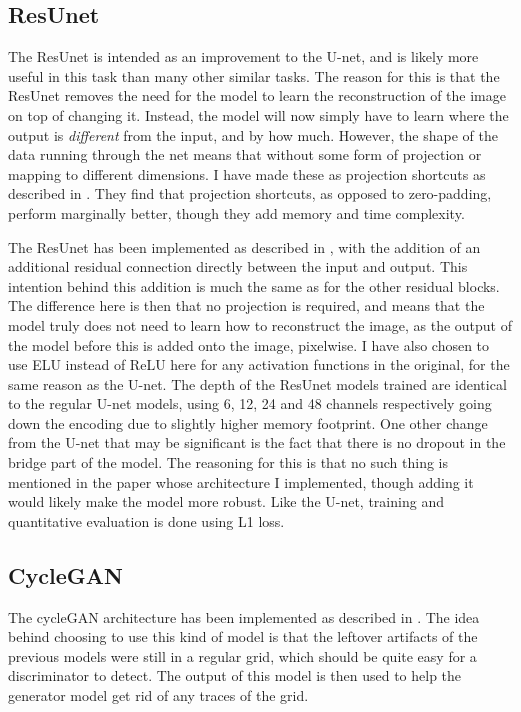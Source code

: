 \subsection{ResUnet}
The ResUnet is intended as an improvement to the U-net, and is likely more useful in this task than many other similar tasks. The reason for this is that the ResUnet removes the need for the model to learn the reconstruction of the image on top of changing it. Instead, the model will now simply have to learn where the output is \textit{different} from the input, and by how much. However, the shape of the data running through the net means that without some form of projection or mapping to different dimensions. I have made these as projection shortcuts as described in \cite{residual}. They find that projection shortcuts, as opposed to zero-padding, perform marginally better, though they add memory and time complexity.

The ResUnet has been implemented as described in \cite{resunet}, with the addition of an additional residual connection directly between the input and output. This intention behind this addition is much the same as for the other residual blocks. The difference here is then that no projection is required, and means that the model truly does not need to learn how to reconstruct the image, as the output of the model before this is added onto the image, pixelwise. I have also chosen to use ELU instead of ReLU here for any activation functions in the original, for the same reason as the U-net. The depth of the ResUnet models trained are identical to the regular U-net models, using 6, 12, 24 and 48 channels respectively going down the encoding due to slightly higher memory footprint. One other change from the U-net that may be significant is the fact that there is no dropout in the bridge part of the model. The reasoning for this is that no such thing is mentioned in the paper whose architecture I implemented, though adding it would likely make the model more robust. Like the U-net, training and quantitative evaluation is done using L1 loss.

\subsection{CycleGAN}
The cycleGAN architecture has been implemented as described in \cite{cyclegan}. The idea behind choosing to use this kind of model is that the leftover artifacts of the previous models were still in a regular grid, which should be quite easy for a discriminator to detect. The output of this model is then used to help the generator model get rid of any traces of the grid.

